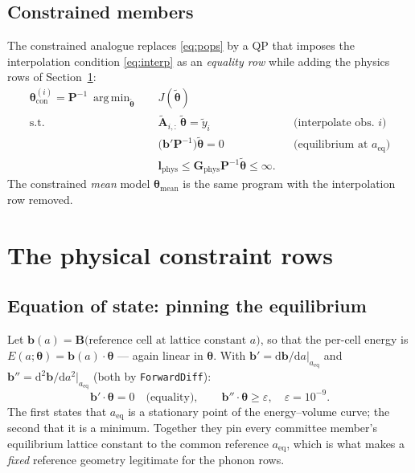 \documentclass[11pt,a4paper]{article}
\newcommand{\aeq}{a_{\mathrm{eq}}}
\newcommand{\dd}{\mathrm{d}}
\DeclareMathOperator*{\argmin}{arg\,min}
\begin{document}
\subsection{Constrained members}

The constrained analogue replaces \eqref{eq:pops} by a QP that imposes the
interpolation condition \eqref{eq:interp} as an \emph{equality row} while adding the
physics rows of Section~\ref{sec:constraints}:
\begin{equation}
\begin{aligned}
\bm\theta^{(i)}_{\mathrm{con}} = \bm P^{-1}\ \argmin_{\tilde{\bm\theta}}\quad & J(\tilde{\bm\theta})\\
\text{s.t.}\quad
& \tilde{\bm A}_{i,:}\,\tilde{\bm\theta} = \tilde y_i && \text{(interpolate obs.\ $i$)}\\
& \big(\bm b'\bm P^{-1}\big)\tilde{\bm\theta} = 0 && \text{(equilibrium at $\aeq$)}\\
& \bm l_{\mathrm{phys}} \le \bm G_{\mathrm{phys}}\bm P^{-1}\tilde{\bm\theta} \le \bm\infty . &&
\end{aligned}
\label{eq:conqp}
\end{equation}
The constrained \emph{mean} model $\bm\theta_{\mathrm{mean}}$ is the same program with
the interpolation row removed.

\section{The physical constraint rows}
\label{sec:constraints}

\subsection{Equation of state: pinning the equilibrium}

Let $\bm b(a)=\bm B\big(\text{reference cell at lattice constant }a\big)$, so that the
per-cell energy is $E(a;\bm\theta)=\bm b(a)\cdot\bm\theta$ --- again linear in
$\bm\theta$. With $\bm b'=\dd\bm b/\dd a|_{\aeq}$ and
$\bm b''=\dd^{2}\bm b/\dd a^{2}|_{\aeq}$ (both by \texttt{ForwardDiff}):
\begin{equation}
\bm b'\cdot\bm\theta = 0 \quad\text{(equality)},
\qquad
\bm b''\cdot\bm\theta \ge \varepsilon,\quad \varepsilon=10^{-9}.
\label{eq:eos}
\end{equation}
The first states that $\aeq$ is a stationary point of the energy--volume curve; the
second that it is a minimum. Together they pin every committee member's equilibrium
lattice constant to the common reference $\aeq$, which is what makes a \emph{fixed}
reference geometry legitimate for the phonon rows.
\end{document}
